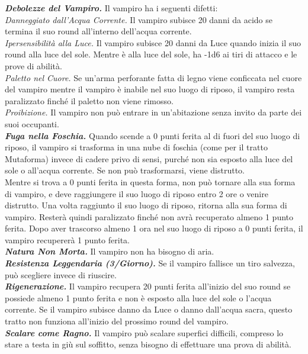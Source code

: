 \begin{multicols}{2}
\emph{\textbf{Debolezze del Vampiro.}} Il vampiro ha i seguenti difetti:\\
\emph{Danneggiato dall'Acqua Corrente.} Il vampiro subisce 20 danni da acido se termina il suo round all'interno dell'acqua corrente.\\
\emph{Ipersensibilità alla Luce.} Il vampiro subisce 20 danni da Luce quando inizia il suo round alla luce del sole. Mentre è alla luce del sole, ha -1d6 ai tiri di attacco e le prove di abilità. \\
\emph{Paletto nel Cuore.} Se un'arma perforante fatta di legno viene conficcata nel cuore del vampiro mentre il vampiro è inabile nel suo luogo di riposo, il vampiro resta paralizzato finché il paletto non viene rimosso.\\
\emph{Proibizione.} Il vampiro non può entrare in un'abitazione senza invito da parte dei suoi occupanti.\\
\emph{\textbf{Fuga nella Foschia.}} Quando scende a 0 punti ferita al di fuori del suo luogo di riposo, il vampiro si trasforma in una nube di foschia (come per il tratto Mutaforma) invece di cadere privo di sensi, purché non sia esposto alla luce del sole o all'acqua corrente. Se non può trasformarsi, viene distrutto.\\
Mentre si trova a 0 punti ferita in questa forma, non può tornare alla sua forma di vampiro, e deve raggiungere il suo luogo di riposo entro 2 ore o venire distrutto. Una volta raggiunto il suo luogo di riposo, ritorna alla sua forma di vampiro. Resterà quindi paralizzato finché non avrà recuperato almeno 1 punto ferita. Dopo aver trascorso almeno 1 ora nel suo luogo di riposo a 0 punti ferita, il vampiro recupererà 1 punto ferita.\\
\emph{\textbf{Natura Non Morta.}} Il vampiro non ha bisogno di aria. \\
\emph{\textbf{Resistenza Leggendaria (3/Giorno).}} Se il vampiro fallisce un tiro salvezza, può scegliere invece di riuscire.\\
\emph{\textbf{Rigenerazione.}} Il vampiro recupera 20 punti ferita all'inizio del suo round se possiede almeno 1 punto ferita e non è esposto alla luce del sole o l'acqua corrente. Se il vampiro subisce danno da Luce o danno dall'acqua sacra, questo tratto non funziona all'inizio del prossimo round del vampiro.\\
\emph{\textbf{Scalare come Ragno.}} Il vampiro può scalare superfici difficili, compreso lo stare a testa in giù sul soffitto, senza bisogno di effettuare una prova di abilità.\\

\end{multicols}
